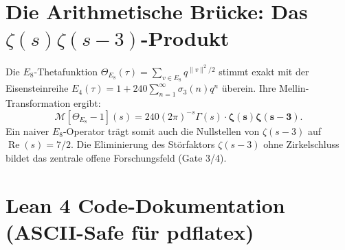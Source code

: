 \documentclass[11pt,a4paper]{article}
\begin{document}
	\section{Die Arithmetische Brücke: Das $\zeta(s)\zeta(s-3)$-Produkt}
	
	Die $E_8$-Thetafunktion $\Theta_{E_8}(\tau) = \sum_{v \in E_8} q^{\|v\|^2/2}$ stimmt exakt mit der Eisensteinreihe $E_4(\tau) = 1 + 240 \sum_{n=1}^\infty \sigma_3(n) q^n$ überein. Ihre Mellin-Transformation ergibt:
	\begin{equation}
		\mathcal{M}[\Theta_{E_8} - 1](s) = 240 (2\pi)^{-s} \Gamma(s) \cdot \mathbf{\zeta(s)\zeta(s-3)}.
	\end{equation}
	Ein naiver $E_8$-Operator trägt somit auch die Nullstellen von $\zeta(s-3)$ auf $\operatorname{Re}(s) = 7/2$. Die Eliminierung des Störfaktors $\zeta(s-3)$ ohne Zirkelschluss bildet das zentrale offene Forschungsfeld (Gate 3/4).
	
	\newpage
	\appendix
	\section{Lean 4 Code-Dokumentation (ASCII-Safe für pdflatex)}
	
\end{document}
